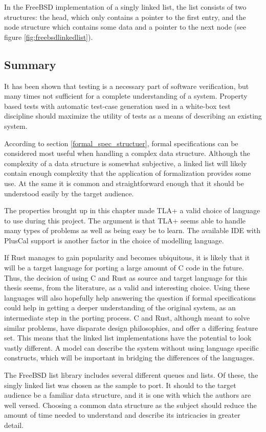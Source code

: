 In the FreeBSD implementation of a singly linked list, the list consists of two structures: the head, which only contains a pointer to the first entry, and the node structure which contains some data and a pointer to the next node (see figure \ref{fig:freebsdlinkedlist}). 

\subsection{Summary}\label{motivation}

It has been shown that testing is a necessary part of software verification, but many times not sufficient for a complete understanding of a system. Property based tests with automatic test-case generation used in a white-box test discipline should maximize the utility of tests as a means of describing an existing system.

According to section \ref{formal_spec_structuer}, formal specifications can be considered most useful when handling a complex data structure. Although the complexity of a data structure is somewhat subjective, a linked list will likely contain enough complexity that the application of formalization provides some use. At the same it is common and straightforward enough that it should be understood easily by the target audience.

The properties brought up in this chapter made TLA+ a valid choice of language to use during this project. The argument is that TLA+ seems able to handle many types of problems as well as being easy be to learn. The available IDE with PlusCal support is another factor in the choice of modelling language.

If Rust manages to gain popularity and becomes ubiquitous, it is likely that it will be a target language for porting a large amount of C code in the future. Thus, the decision of using C and Rust as source and target language for this thesis seems, from the literature, as a valid and interesting choice. Using these languages will also hopefully help answering the question if formal specifications could help in getting a deeper understanding of the original system, as an intermediate step in the porting process. C and Rust, although meant to solve similar problems, have disparate design philosophies, and offer a differing feature set. This means that the linked list implementations have the potential to look vastly different. A model can describe the system without using language specific constructs, which will be important in bridging the differences of the languages.

The FreeBSD list library includes several different queues and lists. Of these, the singly linked list was chosen as the sample to port. It should to the target audience be a familiar data structure, and it is one with which the authors are well versed. Choosing a common data structure as the subject should reduce the amount of time needed to understand and describe its intricacies in greater detail.
